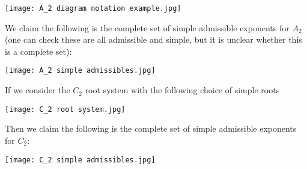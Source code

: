 \documentclass[12pt]{amsart}
\theoremstyle{remark}
\theoremstyle{remark}
\theoremstyle{remark}
\begin{document}
\centerline{\texttt{[image: A\_2 diagram notation example.jpg]}}

\noindent
We claim the following is the complete set of simple admissible exponents for $A_2$ (one can check these are all admissible and simple, but it is unclear whether this is a complete set):

\centerline{\texttt{[image: A\_2 simple admissibles.jpg]}}

\newpage
\noindent
If we consider the $C_2$ root system with the following choice of simple roots

\centerline{\texttt{[image: C\_2 root system.jpg]}}

\noindent
Then we claim the following is the complete set of simple admissible exponents for $C_2$:

\centerline{\texttt{[image: C\_2 simple admissibles.jpg]}}
\end{document}
